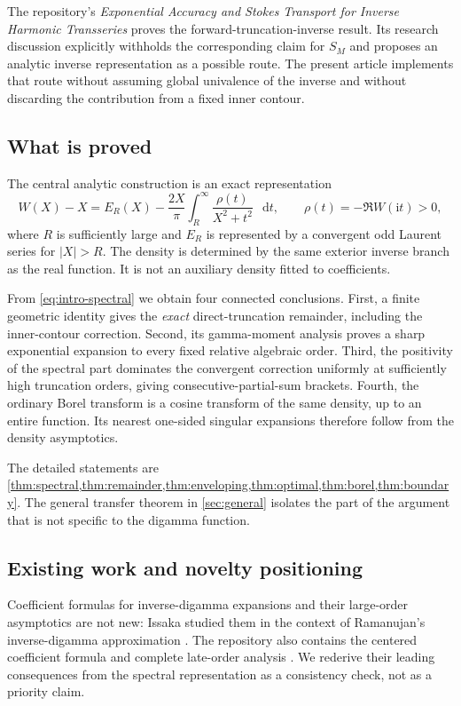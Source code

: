 \documentclass[11pt,a4paper]{article}
\theoremstyle{definition}
\numberwithin{equation}{section}
\newcommand{\dd}{\mathop{}\!\mathrm{d}}
\newcommand{\ii}{\mathrm{i}}
\begin{document}
The repository's \emph{Exponential Accuracy and Stokes Transport for Inverse Harmonic Transseries} \cite{prior} proves the forward-truncation-inverse result. Its research discussion explicitly withholds the corresponding claim for $S_M$ and proposes an analytic inverse representation as a possible route. The present article implements that route without assuming global univalence of the inverse and without discarding the contribution from a fixed inner contour.

\subsection{What is proved}
The central analytic construction is an exact representation
\begin{equation}
 W(X)-X=E_R(X)-\frac{2X}{\pi}
      \int_R^\infty\frac{\rho(t)}{X^2+t^2}\,\dd t,
 \qquad \rho(t)=-\Re W(\ii t)>0,
 \label{eq:intro-spectral}
\end{equation}
where $R$ is sufficiently large and $E_R$ is represented by a convergent odd Laurent series for $|X|>R$. The density is determined by the same exterior inverse branch as the real function. It is not an auxiliary density fitted to coefficients.

From \eqref{eq:intro-spectral} we obtain four connected conclusions. First, a finite geometric identity gives the \emph{exact} direct-truncation remainder, including the inner-contour correction. Second, its gamma-moment analysis proves a sharp exponential expansion to every fixed relative algebraic order. Third, the positivity of the spectral part dominates the convergent correction uniformly at sufficiently high truncation orders, giving consecutive-partial-sum brackets. Fourth, the ordinary Borel transform is a cosine transform of the same density, up to an entire function. Its nearest one-sided singular expansions therefore follow from the density asymptotics.

The detailed statements are \cref{thm:spectral,thm:remainder,thm:enveloping,thm:optimal,thm:borel,thm:boundary}. The general transfer theorem in \cref{sec:general} isolates the part of the argument that is not specific to the digamma function.

\subsection{Existing work and novelty positioning}
Coefficient formulas for inverse-digamma expansions and their large-order asymptotics are not new: Issaka studied them in the context of Ramanujan's inverse-digamma approximation \cite{issaka}. The repository also contains the centered coefficient formula and complete late-order analysis \cite{prior,companion}. We rederive their leading consequences from the spectral representation as a consistency check, not as a priority claim.
\end{document}
